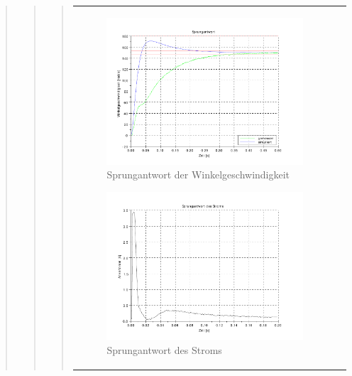 \begin{quote}
\begin{quote}
\begin{quote}
\begin{center}
\begin{tabular}{ll}
\begin{minipage}{0.6\textwidth}
                \begin{figure}[H]
                    \label{fig:sprung_w}
                    \includegraphics[scale=0.7, trim = 8mm 5mm 15mm 10mm, clip]{Bilder/sprung_w}
                    \caption{Sprungantwort der Winkelgeschwindigkeit}
                \end{figure}
                
            \end{minipage}
            
            \begin{minipage}{0.6\textwidth}
                \begin{figure}[H]
                    \label{fig:sprung_i}
                    \includegraphics[scale=0.7, trim = 8mm 5mm 15mm 10mm, clip]{Bilder/sprung_i}
                    \caption{Sprungantwort des Stroms}
                \end{figure}
                

\end{minipage}
\end{tabular}
\end{center}
\end{quote}
\end{quote}
\end{quote}
